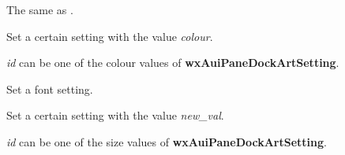 \label{wxauidockartsetcolor}


The same as .

\label{wxauidockartsetcolour}


Set a certain setting with the value {\it colour}.

{\it id} can be one of the colour values of {\bf wxAuiPaneDockArtSetting}.

\label{wxauidockartsetfont}


Set a font setting.

\label{wxauidockartsetmetric}


Set a certain setting with the value {\it new\_val}.

{\it id} can be one of the size values of {\bf wxAuiPaneDockArtSetting}.

